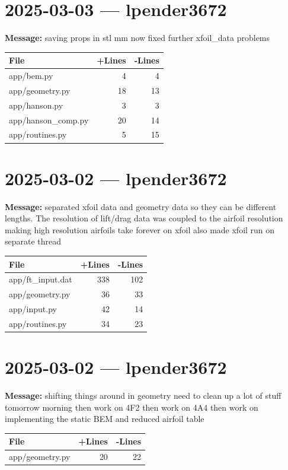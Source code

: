 \documentclass{article}
\begin{document}
\section*{2025-03-03 --- lpender3672}
\textbf{Message:} saving props in stl mm now fixed further xfoil\_data problems

\begin{longtable}{|p{10cm}|r|r|}
\hline \textbf{File} & \textbf{+Lines} & \textbf{-Lines} \\
\hline
app/bem.py & 4 & 4 \\
\hline
app/geometry.py & 18 & 13 \\
\hline
app/hanson.py & 3 & 3 \\
\hline
app/hanson\_comp.py & 20 & 14 \\
\hline
app/routines.py & 5 & 15 \\
\hline
\end{longtable}

\section*{2025-03-02 --- lpender3672}
\textbf{Message:} separated xfoil data and geometry data so they can be different lengths. The resolution of lift/drag data was coupled to the airfoil resolution making high resolution airfoils take forever on xfoil also made xfoil run on separate thread

\begin{longtable}{|p{10cm}|r|r|}
\hline \textbf{File} & \textbf{+Lines} & \textbf{-Lines} \\
\hline
app/ft\_input.dat & 338 & 102 \\
\hline
app/geometry.py & 36 & 33 \\
\hline
app/input.py & 42 & 14 \\
\hline
app/routines.py & 34 & 23 \\
\hline
\end{longtable}

\section*{2025-03-02 --- lpender3672}
\textbf{Message:} shifting things around in geometry need to clean up a lot of stuff tomorrow morning then work on 4F2 then work on 4A4 then work on implementing the static BEM and reduced airfoil table

\begin{longtable}{|p{10cm}|r|r|}
\hline \textbf{File} & \textbf{+Lines} & \textbf{-Lines} \\
\hline
app/geometry.py & 20 & 22 \\
\hline
\end{longtable}
\end{document}
